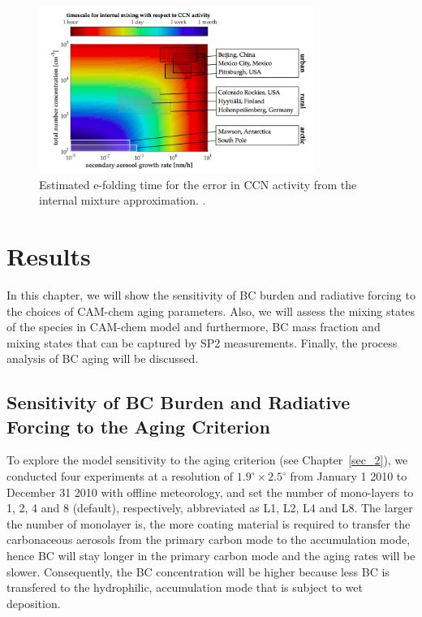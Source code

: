 \documentclass[12pt, fullpage]{uiucthesis2009}
\begin{document}
	\begin{figure}[h] 
		\begin{center}
			\includegraphics[width = 0.8\textwidth]{Figure07}
			\caption[Estimated e-folding time for the error in CCN activity from the internal mixture approximation. \citep{Fierce2016}]{\label{fig_P7}Estimated e-folding time for the error in CCN activity from the internal mixture approximation. \citep{Fierce2016}.}
		\end{center}
	\end{figure}
	
	\clearpage
	
	\chapter{Results}
	In this chapter, we will show the sensitivity of BC burden and radiative forcing to the choices of CAM-chem aging parameters. Also, we will assess the mixing states of the species in CAM-chem model and furthermore, BC mass fraction and mixing states that can be captured by SP2 measurements. Finally, the process analysis of BC aging will be discussed.
	
	\section{Sensitivity of BC Burden and Radiative Forcing to the Aging Criterion}{\label{sec_1}}
	To explore the model sensitivity to the aging criterion (see Chapter~\ref{sec_2}), we conducted four experiments at a resolution of $1.9^\circ \times 2.5^\circ$ from January 1 2010 to December 31 2010 with offline meteorology, and set the number of mono-layers to 1, 2, 4 and 8 (default), respectively, abbreviated as L1, L2, L4 and L8. The larger the number of monolayer is, the more coating material is required to transfer the carbonaceous aerosols from the primary carbon mode to the accumulation mode, hence BC will stay longer in the primary carbon mode and the aging rates will be slower. Consequently, the BC concentration will be higher because less BC is transfered to the hydrophilic, accumulation mode that is subject to wet deposition. 
\end{document}
